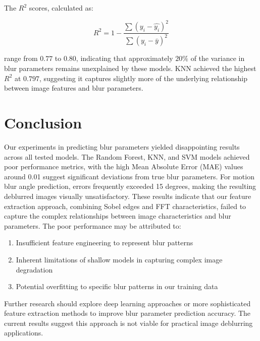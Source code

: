 \documentclass[twoside,11pt]{article}
\begin{document}
The $R^2$ scores, calculated as:

$$
R^2 = 1 - \frac{\sum(y_i - \hat{y_i})^2}{\sum(y_i - \bar{y})^2}
$$

range from $0.77$ to $0.80$, indicating that approximately $20\%$ of the variance in blur parameters remains unexplained by these models. KNN achieved the highest $R^2$ at $0.797$, suggesting it captures slightly more of the underlying relationship between image features and blur parameters.


\newpage
\section{Conclusion}

Our experiments in predicting blur parameters yielded disappointing results across all tested models. The Random Forest, KNN, and SVM models achieved poor performance metrics, with the high Mean Absolute Error (MAE) values around 0.01 suggest significant deviations from true blur parameters. For motion blur angle prediction, errors frequently exceeded 15 degrees, making the resulting deblurred images visually unsatisfactory. These results indicate that our feature extraction approach, combining Sobel edges and FFT characteristics, failed to capture the complex relationships between image characteristics and blur parameters. The poor performance may be attributed to:

\begin{enumerate}
  \item Insufficient feature engineering to represent blur patterns
  \item Inherent limitations of shallow models in capturing complex image degradation
  \item Potential overfitting to specific blur patterns in our training data
  \end{enumerate}

Further research should explore deep learning approaches or more sophisticated feature extraction methods to improve blur parameter prediction accuracy. The current results suggest this approach is not viable for practical image deblurring applications.

\FloatBarrier 

\newpage

\end{document}
